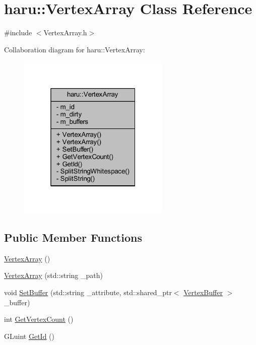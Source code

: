 \hypertarget{classharu_1_1_vertex_array}{}\section{haru\+:\+:Vertex\+Array Class Reference}
\label{classharu_1_1_vertex_array}


{\ttfamily \#include $<$Vertex\+Array.\+h$>$}



Collaboration diagram for haru\+:\+:Vertex\+Array\+:\nopagebreak
\begin{figure}[H]
\begin{center}
\leavevmode
\includegraphics[width=205pt]{classharu_1_1_vertex_array__coll__graph}
\end{center}
\end{figure}
\subsection*{Public Member Functions}
\begin{DoxyCompactItemize}
\item 
\mbox{\hyperlink{classharu_1_1_vertex_array_a53d1c5c6eb05c265f05ed9d06d748f02}{Vertex\+Array}} ()
\item 
\mbox{\hyperlink{classharu_1_1_vertex_array_a8d90e298064690ca3e0ad7fc9aec81b6}{Vertex\+Array}} (std\+::string \+\_\+path)
\item 
void \mbox{\hyperlink{classharu_1_1_vertex_array_aef555fb0ec34f06ed93b9f0d489bf188}{Set\+Buffer}} (std\+::string \+\_\+attribute, std\+::shared\+\_\+ptr$<$ \mbox{\hyperlink{classharu_1_1_vertex_buffer}{Vertex\+Buffer}} $>$ \+\_\+buffer)
\item 
int \mbox{\hyperlink{classharu_1_1_vertex_array_af444883400ad80eacbc8bf32d40a51e1}{Get\+Vertex\+Count}} ()
\item 
G\+Luint \mbox{\hyperlink{classharu_1_1_vertex_array_a9e0954bbf40bfd23997bd4a396e037c0}{Get\+Id}} ()
\end{DoxyCompactItemize}
